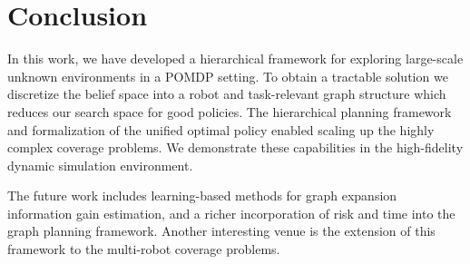 \documentclass{article}
\begin{document}
\section{Conclusion}\label{sec:conclusion}

In this work, we have developed a hierarchical framework for exploring large-scale unknown environments in a POMDP setting. 
To obtain a tractable solution we discretize the belief space into a robot and task-relevant graph structure which reduces our search space for good policies.
The hierarchical planning framework and formalization of the unified optimal policy enabled scaling up the highly complex coverage problems.
We demonstrate these capabilities in the high-fidelity dynamic simulation environment.  

The future work includes learning-based methods for graph expansion information gain estimation, and a richer incorporation of risk and time into the graph planning framework.
Another interesting venue is the extension of this framework to the multi-robot coverage problems.


\clearpage{}

\end{document}

